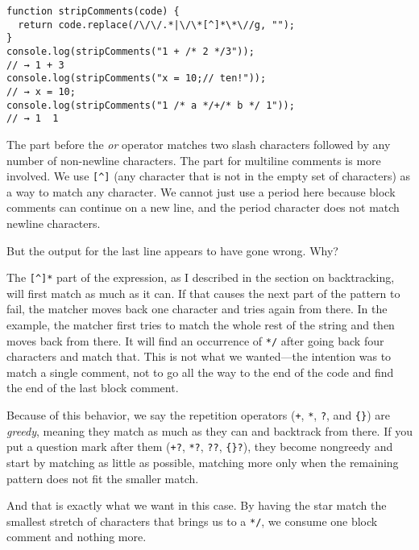 \begin{lstlisting}
function stripComments(code) {
  return code.replace(/\/\/.*|\/\*[^]*\*\//g, "");
}
console.log(stripComments("1 + /* 2 */3"));
// → 1 + 3
console.log(stripComments("x = 10;// ten!"));
// → x = 10;
console.log(stripComments("1 /* a */+/* b */ 1"));
// → 1  1
\end{lstlisting}
\noindent{}

The part before the \emph{or} operator matches two slash characters followed by any number of non-newline characters. The part for multiline comments is more involved. We use \lstinline`[^]` (any character that is not in the empty set of characters) as a way to match any character. We cannot just use a period here because block comments can continue on a new line, and the period character does not match newline characters.

But the output for the last line appears to have gone wrong. Why?

The \lstinline`[^]*` part of the expression, as I described in the section on backtracking, will first match as much as it can. If that causes the next part of the pattern to fail, the matcher moves back one character and tries again from there. In the example, the matcher first tries to match the whole rest of the string and then moves back from there. It will find an occurrence of \lstinline`*/` after going back four characters and match that. This is not what we wanted—the intention was to match a single comment, not to go all the way to the end of the code and find the end of the last block comment.

Because of this behavior, we say the repetition operators (\lstinline`+`, \lstinline`*`, \lstinline`?`, and \lstinline`{}`) are \emph{greedy}, meaning they match as much as they can and backtrack from there. If you put a question mark after them (\lstinline`+?`, \lstinline`*?`, \lstinline`??`, \lstinline`{}?`), they become nongreedy and start by matching as little as possible, matching more only when the remaining pattern does not fit the smaller match.

And that is exactly what we want in this case. By having the star match the smallest stretch of characters that brings us to a \lstinline`*/`, we consume one block comment and nothing more.

